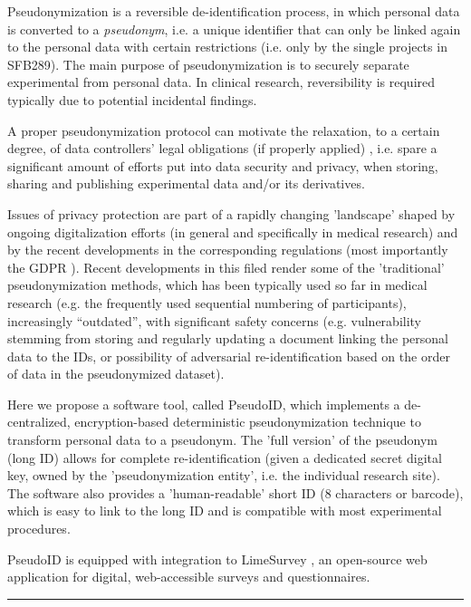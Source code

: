 Pseudonymization is a reversible de-identification process, in which personal data is converted to a \emph{pseudonym}, i.e. a unique identifier that can only be linked again to the personal data with certain restrictions (i.e. only by the single projects in SFB289). The main purpose of pseudonymization is to securely separate experimental from personal data. In clinical research, reversibility is required typically due to potential incidental findings.

A proper pseudonymization protocol can motivate the relaxation, to a certain degree, of data controllers’ legal obligations (if properly applied) \cite{pseudonym}, i.e. spare a significant amount of efforts put into data security and privacy, when storing, sharing and publishing experimental data and/or its derivatives.

Issues of privacy protection are part of a rapidly changing 'landscape' shaped by ongoing digitalization efforts (in general and specifically in medical research) and by the recent developments in the corresponding regulations (most importantly the GDPR \cite{gdpr}). Recent developments in  this filed render some of the 'traditional' pseudonymization methods, which has been typically used so far in medical research (e.g. the frequently used sequential numbering of participants), increasingly “outdated”, with significant safety concerns (e.g. vulnerability stemming from storing and regularly updating a document linking the personal data to the IDs, or possibility of adversarial re-identification based on the order of data in the pseudonymized dataset).

Here we propose a software tool, called PseudoID, which implements a de-centralized, encryption-based deterministic pseudonymization technique to transform personal data to a pseudonym.
The 'full version' of the pseudonym (long ID) allows for complete re-identification (given a dedicated secret digital key, owned by the 'pseudonymization entity', i.e. the individual research site). The software also provides a 'human-readable' short ID (8 characters or barcode), which is easy to link to the long ID and is compatible with most experimental procedures.

PseudoID is equipped with integration to LimeSurvey \cite{limesurvey}, an open-source web application for digital, web-accessible surveys and questionnaires.

\par\noindent\rule{\textwidth\color{pniblue}}{0.4pt}

